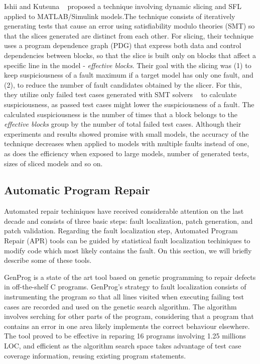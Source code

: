 \documentclass[sigplan,10pt,review,anonymous]{acmart}\settopmatter{printfolios=true,printccs=false,printacmref=false}
\begin{document}
Ishii and Kutsuna ~\cite{li-huo-chen-zhong-feng-li-2013} proposed a
technique involving dynamic slicing and SFL applied to MATLAB/Simulink
models.The technique consists of iteratively
generating tests that cause an error using satisfiability modulo
theories (SMT) so that the slices generated are distinct from each
other.  For slicing, their technique uses a program dependence graph
(PDG) that express both data and control dependencies between blocks,
so that the slice is built only on blocks that affect a specific line
in the model - \textit{effective blocks}.  Their goal with the slicing
was (1) to keep suspiciousness of a fault maximum if a target model
has only one fault, and (2), to reduce the number of fault candidates
obtained by the slicer.  For this, they utilize only failed test cases
generated with SMT solvers ~\cite{peleska-vorobev-lapschies-2011} to
calculate suspiciousness, as passed test cases might lower the
suspiciousness of a fault.  The calculated suspiciousness is the
number of times that a block belongs to the \textit{effective blocks}
group by the number of total failed test cases.  Although their
experiments and results showed promise with small models, the accuracy
of the technique decreases when applied to models with multiple faults
instead of one, as does the efficiency when exposed to large models,
number of generated tests, sizes of sliced models and so on.




\subsection{Automatic Program Repair}
Automated repair techiniques have received considerable attention on
the last decade and consists of three basic steps: fault localization, patch
generation, and patch validation.  Regarding the fault localization
step, Automated Program Repair (APR) tools can be guided by statistical
fault localization techiniques to modify code which most likely
contains the fault. On this section, we will briefly describe some of
these tools.

GenProg is a state of the art tool based on genetic
programming to repair defects in off-the-shelf C programs. GenProg's
strategy to fault localization consists of instrumenting the program
so that all lines visited when executing failing test cases are
recorded and used on the genetic search algorithm. The algorithm
involves serching for other parts of the program, considering that a
program that contains an error in one area likely implements the
correct behaviour elsewhere. The tool proved to be effective in
reparing 16 programs involving 1.25 millions LOC, and efficient as the
algorithm search space takes advantage of test case coverage
information, reusing  existing program statements.
\end{document}
